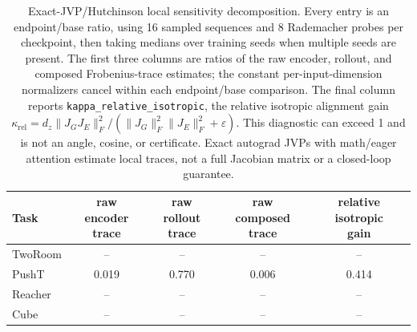 \begin{table}[H]
\centering
\caption{Exact-JVP/Hutchinson local sensitivity decomposition. Every entry is an endpoint/base ratio, using 16 sampled sequences and 8 Rademacher probes per checkpoint, then taking medians over training seeds when multiple seeds are present. The first three columns are ratios of the raw encoder, rollout, and composed Frobenius-trace estimates; the constant per-input-dimension normalizers cancel within each endpoint/base comparison. The final column reports \texttt{kappa\_relative\_isotropic}, the relative isotropic alignment gain $\kappa_{\mathrm{rel}}=d_z\lVert J_GJ_E\rVert_F^2/(\lVert J_G\rVert_F^2\lVert J_E\rVert_F^2+\varepsilon)$. This diagnostic can exceed 1 and is not an angle, cosine, or certificate. Exact autograd JVPs with math/eager attention estimate local traces, not a full Jacobian matrix or a closed-loop guarantee.}
\label{tab:jvp-hutchinson-sensitivity-audit}
\small
\setlength{\tabcolsep}{3.5pt}
\begin{tabular}{lcccc}
\toprule
Task & \shortstack{raw encoder\\trace} & \shortstack{raw rollout\\trace} & \shortstack{raw composed\\trace} & \shortstack{relative isotropic\\gain} \\
\midrule
TwoRoom & -- & -- & -- & -- \\
PushT & 0.019 & 0.770 & 0.006 & 0.414 \\
Reacher & -- & -- & -- & -- \\
Cube & -- & -- & -- & -- \\
\bottomrule
\end{tabular}
\end{table}
